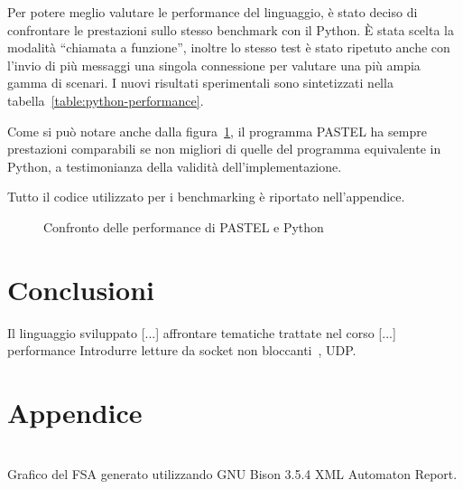 \documentclass[10pt]{article}
\begin{document}
Per potere meglio valutare le performance del linguaggio, è stato deciso di confrontare le prestazioni sullo stesso benchmark con il Python. È stata scelta la modalità ``chiamata a funzione'', inoltre lo stesso test è stato ripetuto anche con l'invio di più messaggi una singola connessione per valutare una più ampia gamma di scenari. I nuovi risultati sperimentali sono sintetizzati nella tabella~\ref{table:python-performance}.

Come si può notare anche dalla figura~\ref{fig:performance-comparison}, il programma PASTEL ha sempre prestazioni comparabili se non migliori di quelle del programma equivalente in Python, a testimonianza della validità dell'implementazione.

Tutto il codice utilizzato per i benchmarking è riportato nell'appendice.



\begin{figure}
	\centering
	\caption{Confronto delle performance di PASTEL e Python}
	\label{fig:performance-comparison}
\end{figure}



\section{Conclusioni}\label{section:conclusioni}

Il linguaggio sviluppato [...] affrontare tematiche trattate nel corso [...] performance
Introdurre letture da socket non bloccanti~\cite{hall2001beej}, UDP.

\clearpage



\clearpage



\section*{Appendice}\label{section:appendix}

\begin{center}
	\centering
	\\
	Grafico del FSA generato utilizzando GNU Bison 3.5.4 XML Automaton Report.
\end{center}
\end{document}
